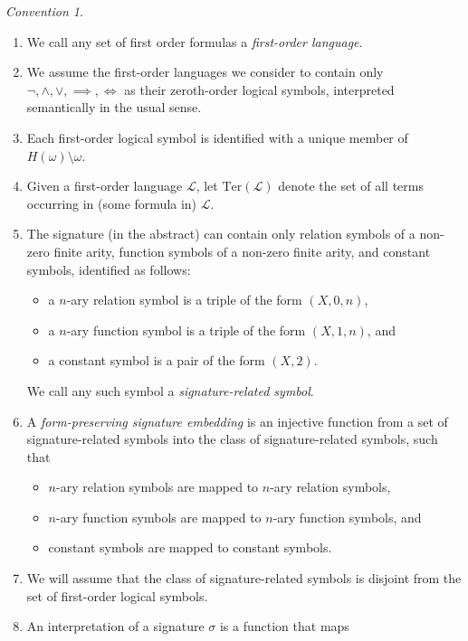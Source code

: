 \documentclass[12pt, twoside]{memoir}
\numberwithin{equation}{section}
\theoremstyle{definition}
\theoremstyle{remark}
\newtheorem{con}[thm]{Convention}
\theoremstyle{definition}
\theoremstyle{definition}
\theoremstyle{definition}
\theoremstyle{remark}
\begin{document}
\begin{con}\label{firstconv}
\leavevmode
\begin{enumerate}[label=(\arabic*)]
    \item We call any set of first order formulas a \emph{first-order language}.
    \item We assume the first-order languages we consider to contain only $\neg, \wedge, \vee, \implies, \iff$ as their zeroth-order logical symbols, interpreted semantically in the usual sense. 
    \item Each first-order logical symbol is identified with a unique member of $H(\omega) \setminus \omega$.
    \item Given a first-order language $\mathcal{L}$, let $\mathrm{Ter}(\mathcal{L})$ denote the set of all terms occurring in (some formula in) $\mathcal{L}$.
    \item The signature (in the abstract) can contain only relation symbols of a non-zero finite arity, function symbols of a non-zero finite arity, and constant symbols, identified as follows:
    \begin{itemize}
        \item a $n$-ary relation symbol is a triple of the form $(X, 0, n)$,
        \item a $n$-ary function symbol is a triple of the form $(X, 1, n)$, and
        \item a constant symbol is a pair of the form $(X, 2)$.
    \end{itemize}
    We call any such symbol a \emph{signature-related symbol}.
    \item A \emph{form-preserving signature embedding} is an injective function from a set of signature-related symbols into the class of signature-related symbols, such that
    \begin{itemize}
        \item $n$-ary relation symbols are mapped to $n$-ary relation symbols,
        \item $n$-ary function symbols are mapped to $n$-ary function symbols, and
        \item constant symbols are mapped to constant symbols.
    \end{itemize}
    \item\label{227} We will assume that the class of signature-related symbols is disjoint from the set of first-order logical symbols.
    \item An interpretation of a signature $\sigma$ is a function that maps
    \begin{itemize}

\end{itemize}
\end{enumerate}
\end{con}
\end{document}
